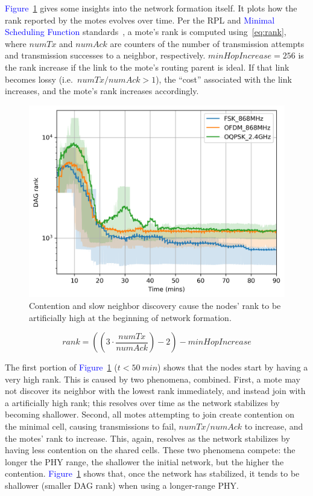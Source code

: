 \documentclass[sensors,article,submit,moreauthors,pdftex]{Definitions/mdpi}
\newcommand{\figwidth}      {0.78}
\newcommand{\update}[1]     {\textcolor{blue}{#1}}
\begin{document}

\update{Figure}~\ref{fig:dagrank_time} gives some insights into the network formation itself.
It plots how the rank reported by the motes evolves over time.
Per the RPL and \update{Minimal Scheduling Function} standards~\cite{rfc6550,draft-ietf-6tisch-msf}, a mote's rank is computed using~\eqref{eq:rank}, where $numTx$ and $numAck$ are counters of the number of transmission attempts and transmission successes to a neighbor, respectively.
$minHopIncrease = 256$ is the rank increase if the link to the mote's routing parent is ideal.
If that link becomes lossy (i.e.~$numTx/numAck>1$), the ``cost'' associated with the link increases, and the mote's rank increases accordingly.

\begin{figure}[ht]
	\centering
	\includegraphics[width=\figwidth\columnwidth]{dagrank_time}
    \caption{Contention and slow neighbor discovery cause the nodes' rank to be artificially high at the beginning of network formation.}
    \label{fig:dagrank_time}
\end{figure}

\begin{equation}
    rank = ((3 \cdot \frac{numTx}{numAck})-2)-minHopIncrease
    \label{eq:rank}
\end{equation}

The first portion of \update{Figure}~\ref{fig:dagrank_time} ($t<50~min$) shows that the nodes start by having a very high rank.
This is caused by two phenomena, combined.
First, a mote may not discover its neighbor with the lowest rank immediately, and instead join with a artificially high rank; this resolves over time as the network stabilizes by becoming shallower.
Second, all motes attempting to join create contention on the minimal cell, causing
    transmissions to fail,
    $numTx/numAck$ to increase, and
    the motes' rank to increase.
This, again, resolves as the network stabilizes by having less contention on the shared cells.
These two phenomena compete: the longer the PHY range, the shallower the initial network, but the higher the contention.
\update{Figure}~\ref{fig:dagrank_time} shows that, once the network has stabilized, it tends to be shallower (smaller DAG rank) when using a longer-range PHY.
\end{document}
